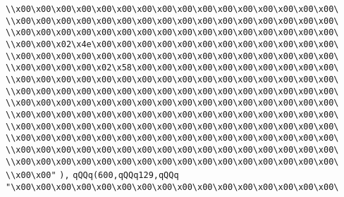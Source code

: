 \verb|\\x00\x00\x00\x00\x00\x00\x00\x00\x00\x00\x00\x00\x00\x00\x00\x00\|\newline
\verb|\\x00\x00\x00\x00\x00\x00\x00\x00\x00\x00\x00\x00\x00\x00\x00\x00\|\newline
\verb|\\x00\x00\x00\x00\x00\x00\x00\x00\x00\x00\x00\x00\x00\x00\x00\x00\|\newline
\verb|\\x00\x00\x02\x4e\x00\x00\x00\x00\x00\x00\x00\x00\x00\x00\x00\x00\|\newline
\verb|\\x00\x00\x00\x00\x00\x00\x00\x00\x00\x00\x00\x00\x00\x00\x00\x00\|\newline
\verb|\\x00\x00\x00\x00\x02\x58\x00\x00\x00\x00\x00\x00\x00\x00\x00\x00\|\newline
\verb|\\x00\x00\x00\x00\x00\x00\x00\x00\x00\x00\x00\x00\x00\x00\x00\x00\|\newline
\verb|\\x00\x00\x00\x00\x00\x00\x00\x00\x00\x00\x00\x00\x00\x00\x00\x00\|\newline
\verb|\\x00\x00\x00\x00\x00\x00\x00\x00\x00\x00\x00\x00\x00\x00\x00\x00\|\newline
\verb|\\x00\x00\x00\x00\x00\x00\x00\x00\x00\x00\x00\x00\x00\x00\x00\x00\|\newline
\verb|\\x00\x00\x00\x00\x00\x00\x00\x00\x00\x00\x00\x00\x00\x00\x00\x00\|\newline
\verb|\\x00\x00\x00\x00\x00\x00\x00\x00\x00\x00\x00\x00\x00\x00\x00\x00\|\newline
\verb|\\x00\x00\x00\x00\x00\x00\x00\x00\x00\x00\x00\x00\x00\x00\x00\x00\|\newline
\verb|\\x00\x00\x00\x00\x00\x00\x00\x00\x00\x00\x00\x00\x00\x00\x00\x00\|\newline
\verb|\\x00\x00"|\newline
\verb|),|\newline
\verb|qQQq(600,qQQq129,qQQq|\newline
\verb|"\x00\x00\x00\x00\x00\x00\x00\x00\x00\x00\x00\x00\x00\x00\x00\x00\|\newline
